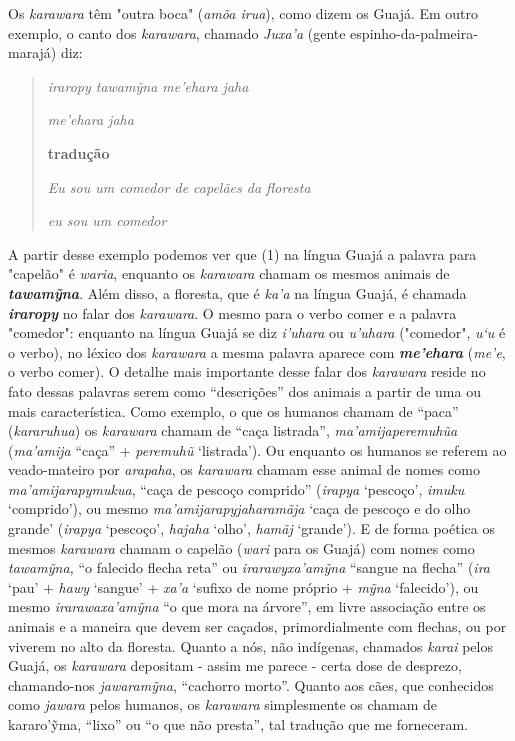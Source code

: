 Os \emph{karawara} têm "outra boca" (\emph{amõa irua}), como dizem os
Guajá. Em outro exemplo, o canto dos \emph{karawara}, chamado
\emph{Juxa'a} (gente espinho-da-palmeira-marajá) diz:

\begin{quote}
\emph{iraropy tawamỹna me'ehara jaha }

\emph{me'ehara jaha}

\textbf{tradução}

\emph{Eu sou um comedor de capelães da floresta}

\emph{eu sou um comedor}
\end{quote}

A partir desse exemplo podemos ver que (1) na língua Guajá a palavra
para "capelão" é \emph{waria}, enquanto os \emph{karawara} chamam os
mesmos animais de \emph{\textbf{tawamỹna}}. Além disso, a floresta, que
é \emph{ka'a} na língua Guajá, é chamada \emph{\textbf{iraropy}} no
falar dos \emph{karawara}. O mesmo para o verbo comer e a palavra
"comedor": enquanto na língua Guajá se diz \emph{i'uhara} ou
\emph{u'uhara} ("comedor", \emph{u`u} é o verbo), no léxico dos
\emph{karawara} a mesma palavra aparece com \emph{\textbf{me'ehara}}
(\emph{me'e}, o verbo comer). O detalhe mais importante desse falar dos
\emph{karawara} reside no fato dessas palavras serem como ``descrições''
dos animais a partir de uma ou mais característica. Como exemplo, o que
os humanos chamam de ``paca'' (\emph{kararuhua}) os \emph{karawara}
chamam de ``caça listrada'', \emph{ma'amijaperemuhũa} (\emph{ma'amija}
``caça'' + \emph{peremuhũ} `listrada'). Ou enquanto os humanos se
referem ao veado-mateiro por \emph{arapaha}, os \emph{karawara} chamam
esse animal de nomes como \emph{ma'amijarapymukua}, ``caça de pescoço
comprido'' (\emph{irapya} `pescoço', \emph{imuku} `comprido'), ou mesmo
\emph{ma'amijarapyjaharamãja} `caça de pescoço e do olho grande'
(\emph{irapya} `pescoço', \emph{hajaha} `olho', \emph{hamãj} `grande').
E de forma poética os mesmos \emph{karawara} chamam o capelão
(\emph{wari} para os Guajá) com nomes como \emph{tawamỹna,} ``o falecido
flecha reta'' ou \emph{irarawyxa'amỹna} ``sangue na flecha'' (\emph{ira}
`pau' + \emph{hawy} `sangue' + \emph{xa'a} `sufixo de nome próprio +
\emph{mỹna} `falecido'), ou mesmo \emph{irarawaxa'amỹna} ``o que mora na
árvore'', em livre associação entre os animais e a maneira que devem ser
caçados, primordialmente com flechas, ou por viverem no alto da
floresta. Quanto a nós, não indígenas, chamados \emph{karai} pelos
Guajá, os \emph{karawara} depositam - assim me parece - certa dose de
desprezo, chamando-nos \emph{jawaramỹna}, ``cachorro morto''. Quanto aos
cães, que conhecidos como \emph{jawara} pelos humanos, os
\emph{karawara} simplesmente os chamam de kararo'ỹma, ``lixo'' ou ``o
que não presta'', tal tradução que me forneceram.

